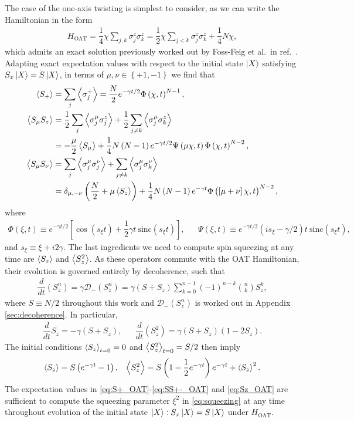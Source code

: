 \documentclass[aps,notitlepage,nofootinbib,11pt]{revtex4-1}
\renewcommand{\t}{\text} %
\newcommand{\f}[2]{\dfrac{#1}{#2}} %
\newcommand{\p}[1]{\left(#1\right)} %
\renewcommand{\sp}[1]{\left[#1\right]} %
\renewcommand{\set}[1]{\left\{#1\right\}} %
\newcommand{\bk}{\Braket} %
\newcommand{\D}{\mathcal{D}}
\newcommand{\1}{\mathds{1}}
\begin{document}
The case of the one-axis twisting is simplest to consider, as we can
write the Hamiltonian in the form
\begin{align}
  H_{\t{OAT}} = \f14 \chi \sum_{j,k} \sigma_j^z \sigma_k^z
  = \f12 \chi \sum_{j<k} \sigma_j^z \sigma_k^z + \f14 N \chi,
\end{align}
which admits an exact solution previously worked out by Foss-Feig et
al.~in ref.~\cite{foss-feig2013nonequilibrium}.  Adapting exact
expectation values with respect to the initial state $\ket{X}$
satisfying $S_x\ket{X}=S\ket{X}$, in terms of $\mu,\nu\in\set{+1,-1}$
we find that
\begin{align}
  \bk{S_+}
  &= \sum_j\bk{\sigma_j^+}
  = \f{N}{2} e^{-\gamma t/2} \Phi\p{\chi,t}^{N-1}, \label{eq:S+_OAT} \\
  \bk{S_\mu S_z}
  &= \f12\sum_j\bk{\sigma_j^\mu\sigma_j^z}
  + \f12\sum_{j\ne k} \bk{\sigma_j^\mu \sigma_k^z} \\
  &= -\f{\mu}{2}\bk{S_\mu} + \f14 N \p{N-1} e^{-\gamma t/2}
  \Psi\p{\mu\chi,t} \Phi\p{\chi,t}^{N-2}, \\
  \bk{S_\mu S_\nu}
  &= \sum_j \bk{\sigma_j^\mu \sigma_j^\nu}
  + \sum_{j\ne k} \bk{\sigma_j^\mu \sigma_k^\nu} \\
  &= \delta_{\mu,-\nu} \p{\f{N}{2} + \mu \bk{S_z}}
  + \f14 N \p{N-1} e^{-\gamma t}
  \Phi\p{\sp{\mu+\nu}\chi,t}^{N-2}, \label{eq:SS+-_OAT}
\end{align}
where
\begin{align}
  \Phi\p{\xi,t} \equiv e^{-\gamma t/2}
  \sp{\cos\p{s_\xi t}+\f12\gamma t~\t{sinc}\p{s_\xi t}},
  &&
  \Psi\p{\xi,t} \equiv e^{-\gamma t/2}
  \p{is_\xi-\gamma/2}t~ \t{sinc}\p{s_\xi t},
\end{align}
and $s_\xi \equiv \xi + i2\gamma$.  The last ingredients we need
to compute spin squeezing at any time are $\bk{S_z}$ and $\bk{S_z^2}$.
As these operators commute with the OAT Hamiltonian, their evolution
is governed entirely by decoherence, such that
\begin{align}
  \f{d}{dt}\p{S_z^n}
  = \gamma \D_-\p{S_z^n}
  = \gamma \p{S + S_z} \sum_{k=0}^{n-1}
  \p{-1}^{n-k} { n \choose k } S_z^k,
\end{align}
where $S\equiv N/2$ throughout this work and $\D_-\p{S_z^n}$ is worked
out in Appendix \ref{sec:decoherence}.  In particular,
\begin{align}
  \f{d}{dt} S_z = -\gamma \p{S + S_z},
  &&
  \f{d}{dt}\p{S_z^2} = \gamma \p{S + S_z} \p{1 - 2S_z}.
\end{align}
The initial conditions $\bk{S_z}_{t=0}=0$ and $\bk{S_z^2}_{t=0}=S/2$
then imply
\begin{align}
  \bk{S_z} = S\p{e^{-\gamma t}-1},
  &&
  \bk{S_z^2} = S \p{1 - \f12 e^{-\gamma t}} e^{-\gamma t} + \bk{S_z}^2.
  \label{eq:Sz_OAT}
\end{align}
The expectation values in \eqref{eq:S+_OAT}-\eqref{eq:SS+-_OAT} and
\eqref{eq:Sz_OAT} are sufficient to compute the squeezing parameter
$\xi^2$ in \eqref{eq:squeezing} at any time throughout evolution of
the initial state $\ket{X}:S_x\ket{X}=S\ket{X}$ under $H_{\t{OAT}}$.
\end{document}

